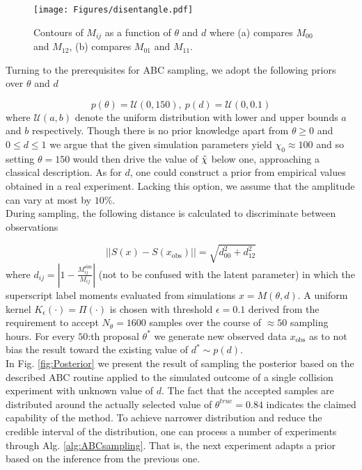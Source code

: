 \documentclass[%
 reprint,
 amsmath,amssymb,
 aps,
]{revtex4-2}
\begin{document}
\begin{figure}[ht]
\centering
\texttt{[image: Figures/disentangle.pdf]}
\caption{\label{fig:Disentangle} Contours of $M_{ij}$ as a function of $\theta$ and $d$ where (a) compares $M_{00}$ and $M_{12}$, (b) compares $M_{01}$ and $M_{11}$.}
\end{figure}
Turning to the prerequisites for ABC sampling, we adopt the following priors over $\theta$ and $d$

\begin{equation}
    p(\theta) = \mathcal{U}(0, 150), \ p(d) = \mathcal{U}(0, 0.1)
\end{equation}
where $\mathcal{U}(a, b)$ denote the uniform distribution with lower and upper bounds $a$ and $b$ respectively. Though there is no prior knowledge apart from $\theta \geq 0$ and $0 \leq d \leq 1$ we argue that the given simulation parameters yield $\chi_0 \approx 100$ and so setting $\theta = 150$ would then drive the value of $\Tilde{\chi}$ below one, approaching a classical description. As for $d$, one could construct a prior from empirical values obtained in a real experiment. Lacking this option, we assume that the amplitude can vary at most by $10 \%$. \\

During sampling, the following distance is calculated to discriminate between observations

\begin{equation}
    ||S(x) - S(x_{\text{obs}})|| = \sqrt{d^2_{00} + d^2_{12}}
\end{equation}
where $d_{ij} = |1 - \frac{M^{\text{sim}}_{ij}}{M_{ij}}|$ (not to be confused with the latent parameter) in which the superscript label moments evaluated from simulations $x = M(\theta, d)$. A uniform kernel $K_{\epsilon}(\cdot) = \Pi(\cdot)$ is chosen with threshold $\epsilon = 0.1$ derived from the requirement to accept $N_{\theta} = 1600$ samples over the course of $\approx 50$ sampling hours. For every $50$:th proposal $\theta^*$ we generate new observed data $x_{\text{obs}}$ as to not bias the result toward the existing value of $d^* \sim p(d)$. \\ 

In Fig. \ref{fig:Posterior} we present the 
result of sampling the posterior based on the described ABC routine applied to the simulated outcome of a single collision experiment with unknown value of $d$. The fact that the accepted samples are distributed around the actually selected value of $\theta^{true} = 0.84$ indicates the claimed capability of the method. To achieve narrower distribution and reduce the credible interval of the distribution, one can process a number of experiments through Alg. \ref{alg:ABCsampling}. That is, the next experiment adapts a prior based on the inference from the previous one.
\end{document}
